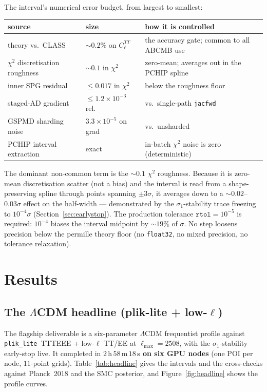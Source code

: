 \documentclass[11pt]{article}
\newcommand{\code}[1]{\texttt{\small #1}}
\newcommand{\Cl}{C_\ell}
\newcommand{\chisq}{\chi^2}
\newcommand{\Lmax}{\ell_{\max}}
\begin{document}
The interval's numerical error budget, from largest to smallest:
\begin{center}
\begin{tabular}{p{}p{}p{}}
\toprule
source & size & how it is controlled \\
\midrule
theory vs.\ CLASS & $\sim0.2\%$ on $\Cl^{TT}$ & the accuracy gate; common to all \textsc{ABCMB} use \\
$\chisq$ discretisation roughness & $\sim0.1$ in $\chisq$ & zero-mean; averages out in the PCHIP spline \\
inner SPG residual & $\le0.017$ in $\chisq$ & below the roughness floor \\
staged-AD gradient & $\le1.2\times10^{-3}$ rel. & vs.\ single-path \code{jacfwd} \\
GSPMD sharding noise & $3.3\times10^{-5}$ on grad & vs.\ unsharded \\
PCHIP interval extraction & exact & in-batch $\chisq$ noise is zero (deterministic) \\
\bottomrule
\end{tabular}
\end{center}
The dominant non-common term is the $\sim0.1$ $\chisq$ roughness. Because it
is zero-mean discretisation scatter (not a bias) and the interval is read
from a shape-preserving spline through points spanning $\pm3\sigma$, it
averages down to a $\sim0.02$--$0.03\sigma$ effect on the half-width ---
demonstrated by the $\sigma_1$-stability trace freezing to $10^{-4}\sigma$
(Section~\ref{sec:earlystop}). The production tolerance
$\mathtt{rtol}=10^{-5}$ is required: $10^{-4}$ biases the interval midpoint
by $\sim19\%$ of $\sigma$. No step loosens precision below the permille
theory floor (no \code{float32}, no mixed precision, no tolerance
relaxation).

\section{Results}
\label{sec:results}

\subsection{The $\Lambda$CDM headline (plik-lite + low-$\ell$)}
\label{sec:headline}

The flagship deliverable is a six-parameter $\Lambda$CDM frequentist
profile against \code{plik\_lite}~TTTEEE + low-$\ell$ TT/EE at
$\Lmax=2508$, with the $\sigma_1$-stability early-stop live. It completed
in \textbf{$2\,\mathrm{h}\,58\,\mathrm{m}\,18\,\mathrm{s}$ on six GPU
nodes} (one POI per node, $11$-point grids). Table~\ref{tab:headline}
gives the intervals and the cross-checks against Planck~2018 and the SMC
posterior, and Figure~\ref{fig:headline} shows the profile curves.
\end{document}
